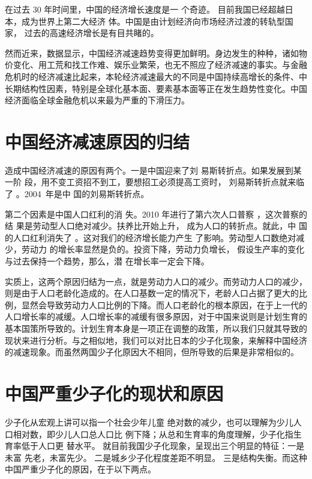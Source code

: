 \documentclass[cs5size,b5paper,nofonts]{ctexart}
\begin{document}
\begin{multicols}{2}

在过去 30 年时间里，中国的经济增长速度是一
个奇迹。
目前我国已经超越日本，成为世界上第二大经济
体。中国是由计划经济向市场经济过渡的转轨型国家，
过去的高速经济增长是有目共睹的。

然而近来，数据显示，中国经济减速趋势变得更加鲜明。身边发生的种种，诸如物价变化、用工荒和找工作难、娱乐业繁荣，也无不照应了经济减速的事实。与金融危机时的经济减速比起来，本轮经济减速最大的不同是中国持续高增长的条件、中长期结构性因素，特别是全球化基本面、要素基本面等正在发生趋势性变化。中国经济面临全球金融危机以来最为严重的下滑压力。

\section{中国经济减速原因的归结}

造成中国经济减速的原因有两个。一是中国迎来了刘
易斯转折点。如果发展到某一阶
段，用不变工资招不到工，要想招工必须提高工资时，
刘易斯转折点就来临了 。2004~年是中
国的刘易斯转折点。

第二个因素是中国人口红利的消
失。2010 年进行了第六次人口普察 \cite{jk}，这次普察的结
果是劳动型人口绝对减少。扶养比开始上升，
成为人口的转折点。就此，中
国的人口红利消失了 。这对我们的经济增长能力产生
了影响。劳动型人口数绝对减少，劳动力
的增长率显然是负的。投资下降，劳动力负增长，
假设生产率的变化与过去保持一个趋势，那么，潜
在增长率一定会下降。

实质上，这两个原因归结为一点，就是劳动力人口的减少。而劳动力人口的减少，则是由于人口老龄化造成的。在人口基数一定的情况下，老龄人口占据了更大的比例，显然会导致劳动力人口比例的下降。而人口老龄化的根本原因，在于上一代的人口增长率的减缓。人口增长率的减缓有很多原因，对于中国来说则是计划生育的基本国策所导致的。计划生育本身是一项正在调整的政策，所以我们只就其导致的现状来进行分析。与之相似地，我们可以对比日本的少子化现象，来解释中国经济的减速现象。而虽然两国少子化原因大不相同，但所导致的后果是非常相似的。

\section{中国严重少子化的现状和原因}

少子化从宏观上讲可以指一个社会少年儿童
绝对数的减少，也可以理解为少儿人口相对数，即少儿人口总人口比
例下降；从总和生育率的角度理解，少子化指生育率低于人口更
替水平。
就目前我国少子化现象，呈现出三个明显的特征：一是未富
先老，未富先少。
二是城乡少子化程度差距不明显。
三是结构失衡。而这种中国严重少子化的原因，在于以下两点。


\end{multicols}
\end{document}

